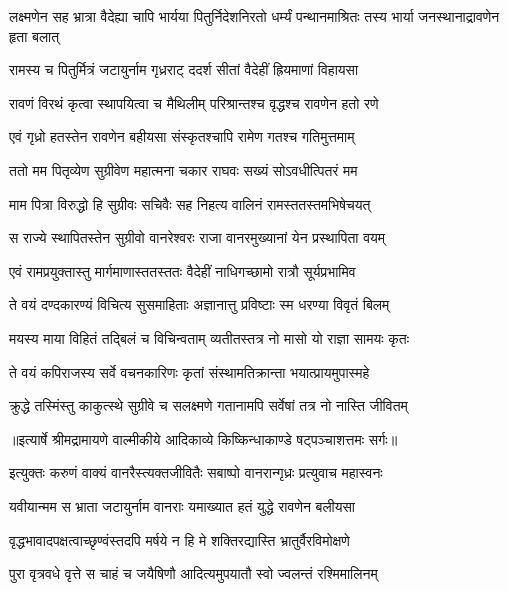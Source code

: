 \threelineshloka
{लक्ष्मणेन सह भ्रात्रा वैदेह्या चापि भार्यया}
{पितुर्निदेशनिरतो धर्म्यं पन्थानमाश्रितः}
{तस्य भार्या जनस्थानाद्रावणेन हृता बलात्} %

\twolineshloka
{रामस्य च पितुर्मित्रं जटायुर्नाम गृध्रराट्}
{ददर्श सीतां वैदेहीं ह्रियमाणां विहायसा} %

\twolineshloka
{रावणं विरथं कृत्वा स्थापयित्वा च मैथिलीम्}
{परिश्रान्तश्च वृद्धश्च रावणेन हतो रणे} %

\twolineshloka
{एवं गृध्रो हतस्तेन रावणेन बहीयसा}
{संस्कृतश्चापि रामेण गतश्च गतिमुत्तमाम्} %

\twolineshloka
{ततो मम पितृव्येण सुग्रीवेण महात्मना}
{चकार राघवः सख्यं सोऽवधीत्पितरं मम} %

\twolineshloka
{माम पित्रा विरुद्धो हि सुग्रीवः सचिवैः सह}
{निहत्य वालिनं रामस्ततस्तमभिषेचयत्} %

\twolineshloka
{स राज्ये स्थापितस्तेन सुग्रीवो वानरेश्वरः}
{राजा वानरमुख्यानां येन प्रस्थापिता वयम्} %

\twolineshloka
{एवं रामप्रयुक्तास्तु मार्गमाणास्ततस्ततः}
{वैदेहीं नाधिगच्छामो रात्रौ सूर्यप्रभामिव} %

\twolineshloka
{ते वयं दण्दकारण्यं विचित्य सुसमाहिताः}
{अज्ञानात्तु प्रविष्टाः स्म धरण्या विवृतं बिलम्} %

\twolineshloka
{मयस्य माया विहितं तद्बिलं च विचिन्वताम्}
{व्यतीतस्तत्र नो मासो यो राज्ञा सामयः कृतः} %

\twolineshloka
{ते वयं कपिराजस्य सर्वे वचनकारिणः}
{कृतां संस्थामतिक्रान्ता भयात्प्रायमुपास्महे} %

\twolineshloka
{क्रुद्धे तस्मिंस्तु काकुत्स्थे सुग्रीवे च सलक्ष्मणे}
{गतानामपि सर्वेषां तत्र नो नास्ति जीवितम्} %


{॥इत्यार्षे श्रीमद्रामायणे वाल्मीकीये आदिकाव्ये किष्किन्धाकाण्डे षट्पञ्चाशत्तमः सर्गः॥}


\twolineshloka
{इत्युक्तः करुणं वाक्यं वानरैस्त्यक्तजीवितैः}
{सबाष्पो वानरान्गृध्रः प्रत्युवाच महास्वनः} %

\twolineshloka
{यवीयान्मम स भ्राता जटायुर्नाम वानराः}
{यमाख्यात हतं युद्धे रावणेन बलीयसा} %

\twolineshloka
{वृद्धभावादपक्षत्वाच्छृण्वंस्तदपि मर्षये}
{न हि मे शक्तिरद्यास्ति भ्रातुर्वैरविमोक्षणे} %

\twolineshloka
{पुरा वृत्रवधे वृत्ते स चाहं च जयैषिणौ}
{आदित्यमुपयातौ स्वो ज्वलन्तं रश्मिमालिनम्} %

